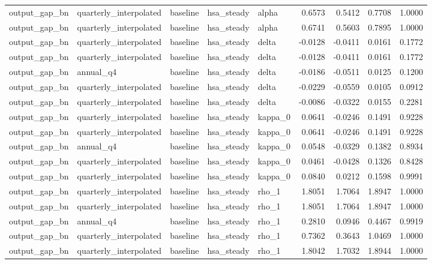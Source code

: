\begin{tabular}{lllllrrrr}
output\_gap\_bn & quarterly\_interpolated & baseline & hsa\_steady & alpha & 0.6573 & 0.5412 & 0.7708 & 1.0000 \\
output\_gap\_bn & quarterly\_interpolated & baseline & hsa\_steady & alpha & 0.6741 & 0.5603 & 0.7895 & 1.0000 \\
output\_gap\_bn & quarterly\_interpolated & baseline & hsa\_steady & delta & -0.0128 & -0.0411 & 0.0161 & 0.1772 \\
output\_gap\_bn & quarterly\_interpolated & baseline & hsa\_steady & delta & -0.0128 & -0.0411 & 0.0161 & 0.1772 \\
output\_gap\_bn & annual\_q4 & baseline & hsa\_steady & delta & -0.0186 & -0.0511 & 0.0125 & 0.1200 \\
output\_gap\_bn & quarterly\_interpolated & baseline & hsa\_steady & delta & -0.0229 & -0.0559 & 0.0105 & 0.0912 \\
output\_gap\_bn & quarterly\_interpolated & baseline & hsa\_steady & delta & -0.0086 & -0.0322 & 0.0155 & 0.2281 \\
output\_gap\_bn & quarterly\_interpolated & baseline & hsa\_steady & kappa\_0 & 0.0641 & -0.0246 & 0.1491 & 0.9228 \\
output\_gap\_bn & quarterly\_interpolated & baseline & hsa\_steady & kappa\_0 & 0.0641 & -0.0246 & 0.1491 & 0.9228 \\
output\_gap\_bn & annual\_q4 & baseline & hsa\_steady & kappa\_0 & 0.0548 & -0.0329 & 0.1382 & 0.8934 \\
output\_gap\_bn & quarterly\_interpolated & baseline & hsa\_steady & kappa\_0 & 0.0461 & -0.0428 & 0.1326 & 0.8428 \\
output\_gap\_bn & quarterly\_interpolated & baseline & hsa\_steady & kappa\_0 & 0.0840 & 0.0212 & 0.1598 & 0.9991 \\
output\_gap\_bn & quarterly\_interpolated & baseline & hsa\_steady & rho\_1 & 1.8051 & 1.7064 & 1.8947 & 1.0000 \\
output\_gap\_bn & quarterly\_interpolated & baseline & hsa\_steady & rho\_1 & 1.8051 & 1.7064 & 1.8947 & 1.0000 \\
output\_gap\_bn & annual\_q4 & baseline & hsa\_steady & rho\_1 & 0.2810 & 0.0946 & 0.4467 & 0.9919 \\
output\_gap\_bn & quarterly\_interpolated & baseline & hsa\_steady & rho\_1 & 0.7362 & 0.3643 & 1.0469 & 1.0000 \\
output\_gap\_bn & quarterly\_interpolated & baseline & hsa\_steady & rho\_1 & 1.8042 & 1.7032 & 1.8944 & 1.0000 \\

\end{tabular}
